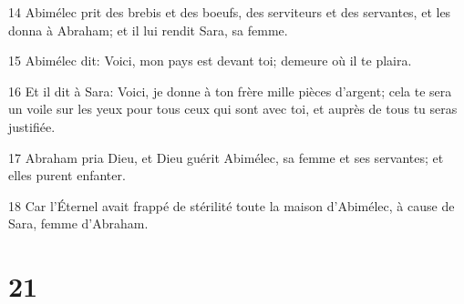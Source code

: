 \par 14 Abimélec prit des brebis et des boeufs, des serviteurs et des servantes, et les donna à Abraham; et il lui rendit Sara, sa femme.
\par 15 Abimélec dit: Voici, mon pays est devant toi; demeure où il te plaira.
\par 16 Et il dit à Sara: Voici, je donne à ton frère mille pièces d'argent; cela te sera un voile sur les yeux pour tous ceux qui sont avec toi, et auprès de tous tu seras justifiée.
\par 17 Abraham pria Dieu, et Dieu guérit Abimélec, sa femme et ses servantes; et elles purent enfanter.
\par 18 Car l'Éternel avait frappé de stérilité toute la maison d'Abimélec, à cause de Sara, femme d'Abraham.

\chapter{21}

